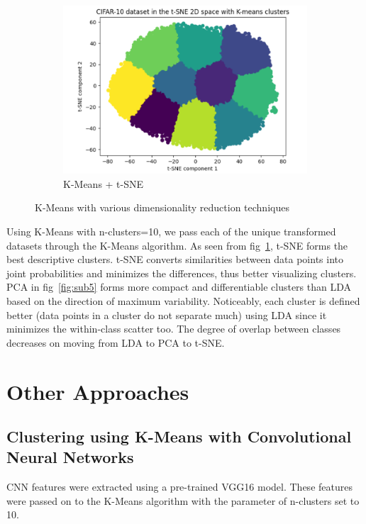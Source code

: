 \documentclass[a4paper]{article}
\theoremstyle{plain}
\theoremstyle{definition}
\begin{document}
{\begin{figure}[h]
\hfill %
\begin{subfigure}{0.305\textwidth} %
  \centering
  \includegraphics[width=\linewidth]{Figures/tsne+k-means.png}
  \captionsetup{font=scriptsize} %
  \caption{K-Means + t-SNE}
  \label{fig:sub6}
\end{subfigure}
\caption{K-Means with various dimensionality reduction techniques}
\label{fig:test}
\end{figure}
\noindent
Using K-Means with n-clusters=10, we pass each of the unique transformed datasets through the K-Means algorithm. As seen from fig~\ref{fig:sub6}, t-SNE forms the best descriptive clusters. t-SNE converts similarities between data points into joint probabilities and minimizes the differences, thus better visualizing clusters. PCA in fig~\ref{fig:sub5} forms more compact and differentiable clusters than LDA based on the direction of maximum variability. Noticeably, each cluster is defined better (data points in a cluster do not separate much) using LDA since it minimizes the within-class scatter too. The degree of overlap between classes decreases on moving from LDA to PCA to t-SNE.

\newpage

\section {Other Approaches}
\subsection {Clustering using K-Means with Convolutional Neural Networks}
\noindent CNN features were extracted using a pre-trained VGG16 model. These features were passed on to the K-Means algorithm with the parameter of n-clusters set to 10.



}
\end{document}
